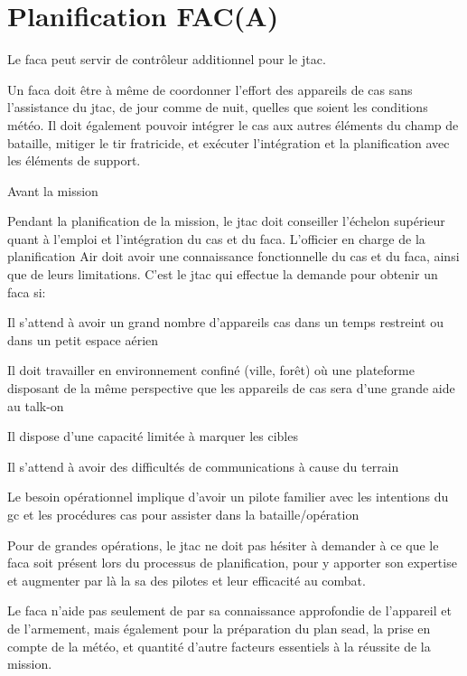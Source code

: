 \section{Planification FAC(A)}\label{facaplanning}

Le \gls{faca} peut servir de contrôleur additionnel pour le \gls{jtac}.

Un \gls{faca} doit être à même de coordonner l'effort des appareils de \gls{cas} sans l'assistance du \gls{jtac}, de jour comme de nuit, quelles que soient les conditions météo. Il doit également pouvoir intégrer le \gls{cas} aux autres éléments du champ de bataille, mitiger le tir fratricide, et exécuter l'intégration et la planification avec les éléments de support.

\begin{e1}
	\item Avant la mission
	\begin{e2}
		\item Pendant la planification de la mission, le \gls{jtac} doit conseiller l'échelon supérieur quant à l'emploi et l'intégration du \gls{cas} et du \gls{faca}. L'officier en charge de la planification Air doit avoir une connaissance fonctionnelle du \gls{cas} et du \gls{faca}, ainsi que de leurs limitations.
		C'est le \gls{jtac} qui effectue la demande pour obtenir un \gls{faca} si:
		\begin{e3}
			\item Il s'attend à avoir un grand nombre d'appareils \gls{cas} dans un temps restreint ou dans un petit espace aérien
			\item Il doit travailler en environnement confiné (ville, forêt) où une plateforme disposant de la même perspective que les appareils de \gls{cas} sera d'une grande aide au talk-on
			\item Il dispose d'une capacité limitée à marquer les cibles
			\item Il s'attend à avoir des difficultés de communications à cause du terrain
			\item Le besoin opérationnel implique d'avoir un pilote familier avec les intentions du \gls{gc} et les procédures \gls{cas} pour assister dans la bataille/opération
		\end{e3}
		\item Pour de grandes opérations, le \gls{jtac} ne doit pas hésiter à demander à ce que le \gls{faca} soit présent lors du processus de planification, pour y apporter son expertise et augmenter par là la \gls{sa} des pilotes et leur efficacité au combat.
		\item Le \gls{faca} n'aide pas seulement de par sa connaissance approfondie de l'appareil et de l'armement, mais également pour la préparation du plan \gls{sead}, la prise en compte de la météo, et quantité d'autre facteurs essentiels à la réussite de la mission.

\end{e2}
\end{e1}
